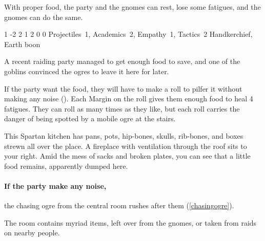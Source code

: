 \begin{multicols}{2}
With proper food, the party and the gnomes can rest, lose some \glspl{fatigue}, and the gnomes can do the same.




{1}%
{-2}%
{{2}%
{1}%
{2}}%
{0}%
{0}%
{Projectiles~1, Academics~2, Empathy~1, Tactics~2}%
{Handkerchief, Earth \gls{boon}}%
{
  \setcounter{Fate}{2}
  \setcounter{Water}{3}
  \setcounter{Earth}{1}
  \setcounter{fp}{3}
}

\secondRaidingParty


\begin{exampletext}
  A recent raiding party managed to get enough food to save, and one of the goblins convinced the ogres to leave it here for later.
\end{exampletext}

If the party want the food, they will have to make a  roll to pilfer it without making any noise (\tn[8]).
Each Margin on the roll gives them enough food to heal 4 \glspl{fatigue}.
They can roll as many times as they like, but each roll carries the danger of being spotted by a mobile ogre at the stairs.

\begin{boxtext}
  This Spartan kitchen has pans, pots, hip-bones, skulls, rib-bones, and boxes strewn all over the place.
  A fireplace with ventilation through the roof sits to your right.
  Amid the mess of sacks and broken plates, you can see that a little food remains, apparently dumped here.
\end{boxtext}

\paragraph{If the party make any noise,}
the chasing ogre from the central room rushes after them (\vref{chasingogre}).


The room contains myriad items, left over from the gnomes, or taken from raids on nearby people.

\columnbreak


\end{multicols}
